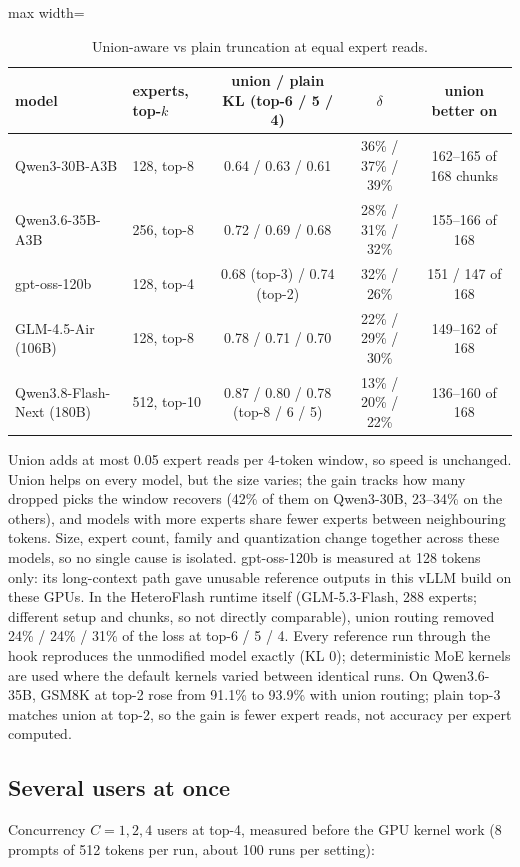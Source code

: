 \documentclass[11pt]{article}
\begin{document}
\begin{table}[h]
\centering\small
\caption{Union-aware vs plain truncation at equal expert reads.}
\label{tab:union}
\setlength{\tabcolsep}{4pt}
\begin{adjustbox}{max width=\linewidth}
\begin{tabular}{llccc}
\toprule
model & experts, top-$k$ & union / plain KL (top-6 / 5 / 4) & $\delta$ & union better on \\
\midrule
Qwen3-30B-A3B & 128, top-8 & 0.64 / 0.63 / 0.61 & 36\% / 37\% / 39\% & 162--165 of 168 chunks \\
Qwen3.6-35B-A3B & 256, top-8 & 0.72 / 0.69 / 0.68 & 28\% / 31\% / 32\% & 155--166 of 168 \\
gpt-oss-120b & 128, top-4 & 0.68 (top-3) / 0.74 (top-2) & 32\% / 26\% & 151 / 147 of 168 \\
GLM-4.5-Air (106B) & 128, top-8 & 0.78 / 0.71 / 0.70 & 22\% / 29\% / 30\% & 149--162 of 168 \\
Qwen3.8-Flash-Next (180B) & 512, top-10 & 0.87 / 0.80 / 0.78 (top-8 / 6 / 5) & 13\% / 20\% / 22\% & 136--160 of 168 \\
\bottomrule
\end{tabular}
\end{adjustbox}
\end{table}

Union adds at most 0.05 expert reads per 4-token window, so speed is unchanged. Union helps on every model, but the size
varies; the gain tracks how many dropped picks the window recovers (42\% of them on Qwen3-30B, 23--34\% on the others),
and models with more experts share fewer experts between neighbouring tokens. Size, expert count, family and
quantization change together across these models, so no single cause is isolated. gpt-oss-120b is measured at 128
tokens only: its long-context path gave unusable reference outputs in this vLLM build on these GPUs. In the HeteroFlash
runtime itself (GLM-5.3-Flash, 288 experts; different setup and chunks, so not directly comparable), union routing
removed 24\% / 24\% / 31\% of the loss at top-6 / 5 / 4. Every reference run through the hook reproduces the unmodified
model exactly (KL 0); deterministic MoE kernels are used where the default kernels varied between identical runs. On
Qwen3.6-35B, GSM8K at top-2 rose from 91.1\% to 93.9\% with union routing; plain top-3 matches union at top-2, so the gain
is fewer expert reads, not accuracy per expert computed.

\FloatBarrier
\subsection{Several users at once}
\label{sec:res-multi}
Concurrency $C = 1, 2, 4$ users at top-4, measured before the GPU kernel work (8 prompts of 512 tokens per run, about
100 runs per setting):
\end{document}
